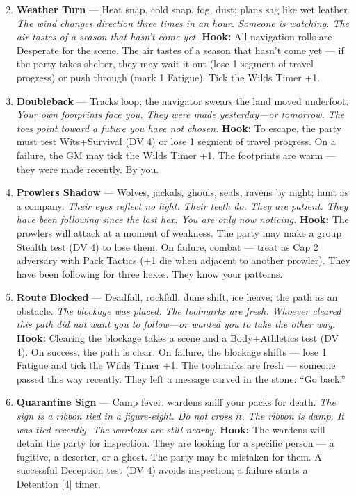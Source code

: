 \begin{enumerate}
\setcounter{enumi}{1}
\item \textbf{Weather Turn} --- Heat snap, cold snap, fog, dust; plans sag like wet leather.
  \hfill \textit{The wind changes direction three times in an hour. Someone is watching. The air tastes of a season that hasn't come yet.}
  \textbf{Hook:} All navigation rolls are Desperate for the scene. The air tastes of a season that hasn't come yet --- if the party takes shelter, they may wait it out (lose 1 segment of travel progress) or push through (mark 1 Fatigue). Tick the Wilds Timer +1.
  
\item \textbf{Doubleback} --- Tracks loop; the navigator swears the land moved underfoot.
  \hfill \textit{Your own footprints face you. They were made yesterday---or tomorrow. The toes point toward a future you have not chosen.}
  \textbf{Hook:} To escape, the party must test Wits+Survival (DV 4) or lose 1 segment of travel progress. On a failure, the GM may tick the Wilds Timer +1. The footprints are warm --- they were made recently. By you.
  
\item \textbf{Prowlers Shadow} --- Wolves, jackals, ghouls, seals, ravens by night; hunt as a company.
  \hfill \textit{Their eyes reflect no light. Their teeth do. They are patient. They have been following since the last hex. You are only now noticing.}
  \textbf{Hook:} The prowlers will attack at a moment of weakness. The party may make a group Stealth test (DV 4) to lose them. On failure, combat --- treat as Cap 2 adversary with Pack Tactics (+1 die when adjacent to another prowler). They have been following for three hexes. They know your patterns.
  
\item \textbf{Route Blocked} --- Deadfall, rockfall, dune shift, ice heave; the path as an obstacle.
  \hfill \textit{The blockage was placed. The toolmarks are fresh. Whoever cleared this path did not want you to follow---or wanted you to take the other way.}
  \textbf{Hook:} Clearing the blockage takes a scene and a Body+Athletics test (DV 4). On success, the path is clear. On failure, the blockage shifts --- lose 1 Fatigue and tick the Wilds Timer +1. The toolmarks are fresh --- someone passed this way recently. They left a message carved in the stone: ``Go back.''
  
\item \textbf{Quarantine Sign} --- Camp fever; wardens sniff your packs for death.
  \hfill \textit{The sign is a ribbon tied in a figure-eight. Do not cross it. The ribbon is damp. It was tied recently. The wardens are still nearby.}
  \textbf{Hook:} The wardens will detain the party for inspection. They are looking for a specific person --- a fugitive, a deserter, or a ghost. The party may be mistaken for them. A successful Deception test (DV 4) avoids inspection; a failure starts a Detention [4] timer.
  

\end{enumerate}
